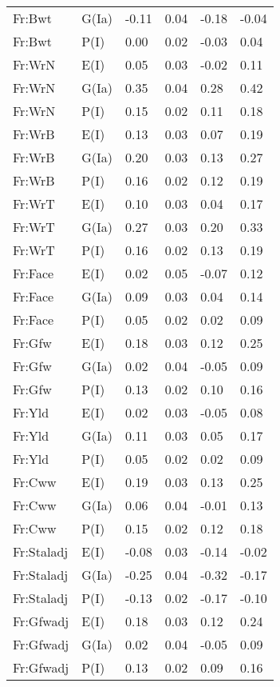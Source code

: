\begin{center}
\begin{longtable}{|p{1.1in}|p{0.7in}|p{0.7in}|p{0.6in}|p{0.6in}|p{0.6in}|}
  Fr:Bwt & G(Ia) & -0.11 & 0.04 & -0.18 & -0.04 \\ 
  Fr:Bwt & P(I) & 0.00 & 0.02 & -0.03 & 0.04 \\ 
  Fr:WrN & E(I) & 0.05 & 0.03 & -0.02 & 0.11 \\ 
  Fr:WrN & G(Ia) & 0.35 & 0.04 & 0.28 & 0.42 \\ 
  Fr:WrN & P(I) & 0.15 & 0.02 & 0.11 & 0.18 \\ 
  Fr:WrB & E(I) & 0.13 & 0.03 & 0.07 & 0.19 \\ 
  Fr:WrB & G(Ia) & 0.20 & 0.03 & 0.13 & 0.27 \\ 
  Fr:WrB & P(I) & 0.16 & 0.02 & 0.12 & 0.19 \\ 
  Fr:WrT & E(I) & 0.10 & 0.03 & 0.04 & 0.17 \\ 
  Fr:WrT & G(Ia) & 0.27 & 0.03 & 0.20 & 0.33 \\ 
  Fr:WrT & P(I) & 0.16 & 0.02 & 0.13 & 0.19 \\ 
  Fr:Face & E(I) & 0.02 & 0.05 & -0.07 & 0.12 \\ 
  Fr:Face & G(Ia) & 0.09 & 0.03 & 0.04 & 0.14 \\ 
  Fr:Face & P(I) & 0.05 & 0.02 & 0.02 & 0.09 \\ 
  Fr:Gfw & E(I) & 0.18 & 0.03 & 0.12 & 0.25 \\ 
  Fr:Gfw & G(Ia) & 0.02 & 0.04 & -0.05 & 0.09 \\ 
  Fr:Gfw & P(I) & 0.13 & 0.02 & 0.10 & 0.16 \\ 
  Fr:Yld & E(I) & 0.02 & 0.03 & -0.05 & 0.08 \\ 
  Fr:Yld & G(Ia) & 0.11 & 0.03 & 0.05 & 0.17 \\ 
  Fr:Yld & P(I) & 0.05 & 0.02 & 0.02 & 0.09 \\ 
  Fr:Cww & E(I) & 0.19 & 0.03 & 0.13 & 0.25 \\ 
  Fr:Cww & G(Ia) & 0.06 & 0.04 & -0.01 & 0.13 \\ 
  Fr:Cww & P(I) & 0.15 & 0.02 & 0.12 & 0.18 \\ 
  Fr:Staladj & E(I) & -0.08 & 0.03 & -0.14 & -0.02 \\ 
  Fr:Staladj & G(Ia) & -0.25 & 0.04 & -0.32 & -0.17 \\ 
  Fr:Staladj & P(I) & -0.13 & 0.02 & -0.17 & -0.10 \\ 
  Fr:Gfwadj & E(I) & 0.18 & 0.03 & 0.12 & 0.24 \\ 
  Fr:Gfwadj & G(Ia) & 0.02 & 0.04 & -0.05 & 0.09 \\ 
  Fr:Gfwadj & P(I) & 0.13 & 0.02 & 0.09 & 0.16 \\ 

\end{longtable}
\end{center}
